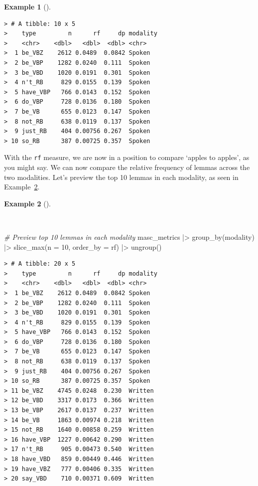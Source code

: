 \documentclass[
  letterpaper,
  DIV=11,
  numbers=noendperiod]{scrreport}
\newenvironment{Shaded}{\begin{snugshade}}{\end{snugshade}}
\newcommand{\AttributeTok}[1]{\textcolor[rgb]{0.00,0.00,0.00}{#1}}
\newcommand{\CommentTok}[1]{\textcolor[rgb]{0.00,0.00,0.00}{\textit{#1}}}
\newcommand{\DecValTok}[1]{\textcolor[rgb]{0.00,0.00,0.00}{#1}}
\newcommand{\FunctionTok}[1]{\textcolor[rgb]{0.00,0.00,0.00}{#1}}
\newcommand{\NormalTok}[1]{\textcolor[rgb]{0.00,0.00,0.00}{#1}}
\newcommand{\SpecialCharTok}[1]{\textcolor[rgb]{0.00,0.00,0.00}{#1}}
\theoremstyle{definition}
\newtheorem{example}{Example}[chapter]
\theoremstyle{remark}
\begin{document}
\begin{example}[]
\begin{verbatim}
> # A tibble: 10 x 5
>    type         n      rf     dp modality
>    <chr>    <dbl>   <dbl>  <dbl> <chr>   
>  1 be_VBZ    2612 0.0489  0.0842 Spoken  
>  2 be_VBP    1282 0.0240  0.111  Spoken  
>  3 be_VBD    1020 0.0191  0.301  Spoken  
>  4 n't_RB     829 0.0155  0.139  Spoken  
>  5 have_VBP   766 0.0143  0.152  Spoken  
>  6 do_VBP     728 0.0136  0.180  Spoken  
>  7 be_VB      655 0.0123  0.147  Spoken  
>  8 not_RB     638 0.0119  0.137  Spoken  
>  9 just_RB    404 0.00756 0.267  Spoken  
> 10 so_RB      387 0.00725 0.357  Spoken
\end{verbatim}

\end{example}

With the \texttt{rf} measure, we are now in a position to compare
`apples to apples', as you might say. We can now compare the relative
frequency of lemmas across the two modalities. Let's preview the top 10
lemmas in each modality, as seen in
Example~\ref{exm-eda-masc-relative-frequency-top}.

\begin{example}[]\protect\hypertarget{exm-eda-masc-relative-frequency-top}{}\label{exm-eda-masc-relative-frequency-top}

~

\begin{Shaded}
\begin{Highlighting}[]
\CommentTok{\# Preview top 10 lemmas in each modality}
\NormalTok{masc\_metrics }\SpecialCharTok{|\textgreater{}} 
  \FunctionTok{group\_by}\NormalTok{(modality) }\SpecialCharTok{|\textgreater{}} 
  \FunctionTok{slice\_max}\NormalTok{(}\AttributeTok{n =} \DecValTok{10}\NormalTok{, }\AttributeTok{order\_by =}\NormalTok{ rf) }\SpecialCharTok{|\textgreater{}}
  \FunctionTok{ungroup}\NormalTok{()}
\end{Highlighting}
\end{Shaded}

\begin{verbatim}
> # A tibble: 20 x 5
>    type         n      rf     dp modality
>    <chr>    <dbl>   <dbl>  <dbl> <chr>   
>  1 be_VBZ    2612 0.0489  0.0842 Spoken  
>  2 be_VBP    1282 0.0240  0.111  Spoken  
>  3 be_VBD    1020 0.0191  0.301  Spoken  
>  4 n't_RB     829 0.0155  0.139  Spoken  
>  5 have_VBP   766 0.0143  0.152  Spoken  
>  6 do_VBP     728 0.0136  0.180  Spoken  
>  7 be_VB      655 0.0123  0.147  Spoken  
>  8 not_RB     638 0.0119  0.137  Spoken  
>  9 just_RB    404 0.00756 0.267  Spoken  
> 10 so_RB      387 0.00725 0.357  Spoken  
> 11 be_VBZ    4745 0.0248  0.230  Written 
> 12 be_VBD    3317 0.0173  0.366  Written 
> 13 be_VBP    2617 0.0137  0.237  Written 
> 14 be_VB     1863 0.00974 0.218  Written 
> 15 not_RB    1640 0.00858 0.259  Written 
> 16 have_VBP  1227 0.00642 0.290  Written 
> 17 n't_RB     905 0.00473 0.540  Written 
> 18 have_VBD   859 0.00449 0.446  Written 
> 19 have_VBZ   777 0.00406 0.335  Written 
> 20 say_VBD    710 0.00371 0.609  Written
\end{verbatim}

\end{example}
\end{document}
